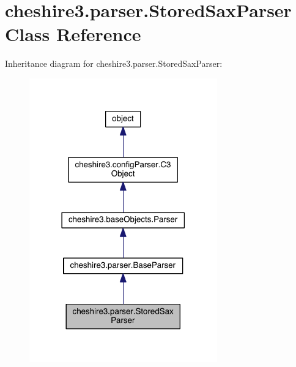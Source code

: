 \hypertarget{classcheshire3_1_1parser_1_1_stored_sax_parser}{\section{cheshire3.\-parser.\-Stored\-Sax\-Parser Class Reference}
\label{classcheshire3_1_1parser_1_1_stored_sax_parser}
}


Inheritance diagram for cheshire3.\-parser.\-Stored\-Sax\-Parser\-:
\nopagebreak
\begin{figure}[H]
\begin{center}
\leavevmode
\includegraphics[width=230pt]{classcheshire3_1_1parser_1_1_stored_sax_parser__inherit__graph}
\end{center}
\end{figure}


